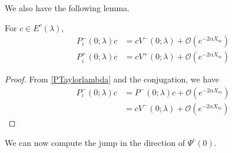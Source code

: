 \documentclass[thesis.tex]{subfiles}
\begin{document}
We also have the following lemma.

\begin{lemma}\label{Ecconj}
For $c \in E^c(\lambda)$, 
\begin{align*}
P_i^-(0; \lambda)c &= c V^-(0; \lambda) + \mathcal{O}(e^{-2\alpha X_m}) \\
P_i^+(0; \lambda)c &= c V^+(0; \lambda) + \mathcal{O}(e^{-2\alpha X_m})
\end{align*}
\begin{proof}
From \eqref{PTaylorlambda} and the conjugation, we have
\begin{align*}
P_i^-(0; \lambda)c &= P^-(0; \lambda)c + \mathcal{O}(e^{-2\alpha X_m}) \\
&= c V^-(0; \lambda) + \mathcal{O}(e^{-2\alpha X_m})
\end{align*}
\end{proof}
\end{lemma}

We can now compute the jump in the direction of $\Psi^c(0)$.
\end{document}
